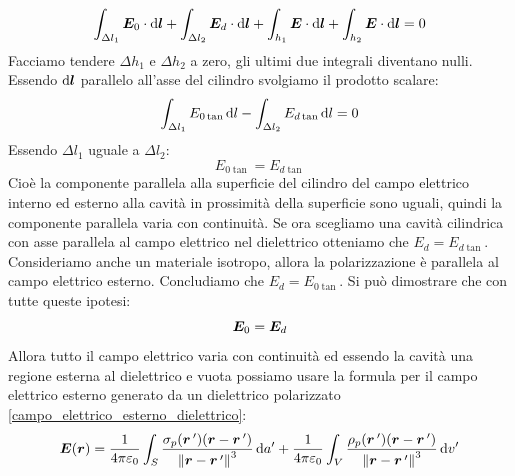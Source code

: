 \begin{equation}
  \int_{\Delta l_1}\boldsymbol{E}_0\cdot\mathrm{d}\boldsymbol{l}+\int_{\Delta l_2}\boldsymbol{E}_d\cdot\mathrm{d}\boldsymbol{l}+\int_{h_1}\boldsymbol{E}\cdot\mathrm{d}\boldsymbol{l}+\int_{h_2}\boldsymbol{E}\cdot\mathrm{d}\boldsymbol{l}=0
\end{equation}
Facciamo tendere $\Delta h_1$ e $\Delta h_2$ a zero, gli ultimi due integrali diventano nulli. Essendo $\mathrm{d} \boldsymbol{l}$ parallelo all'asse del cilindro svolgiamo il prodotto scalare:
\begin{equation}
  \int_{\Delta l_1}E_{0\tan}\,\mathrm{d} l-\int_{\Delta l_2}E_{d\tan}\,\mathrm{d} l=0
\end{equation}
Essendo $\Delta l_1$ uguale a $\Delta l_2$:
\begin{equation}
  E_{0\tan}=E_{d\tan}
  \label{E_tangente10}
\end{equation}
Cioè la componente parallela alla superficie del cilindro del campo elettrico interno ed esterno alla cavità in prossimità della superficie sono uguali, quindi la componente parallela varia con continuità. Se ora scegliamo una cavità cilindrica con asse parallela al campo elettrico nel dielettrico otteniamo che $E_d=E_{d\tan}$. Consideriamo anche un materiale isotropo, allora la polarizzazione è parallela al campo elettrico esterno. Concludiamo che $E_d=E_{0\tan}$. Si può dimostrare che con tutte queste ipotesi:
\begin{equation}
  \boldsymbol{E}_0=\boldsymbol{E}_d
\end{equation}
Allora tutto il campo elettrico varia con continuità ed essendo la cavità una regione esterna al dielettrico e vuota possiamo usare la formula per il campo elettrico esterno generato da un dielettrico polarizzato \eqref{campo_elettrico_esterno_dielettrico}:
\begin{equation}
  \boldsymbol{E}(\boldsymbol{r})=\frac{1}{4\pi\varepsilon_0}\int_S\frac{\sigma_p(\boldsymbol{r}\,')(\boldsymbol{r}-\boldsymbol{r}\,')}{\left\lVert\boldsymbol{r}-\boldsymbol{r}\,'\right\rVert^3}\,\mathrm{d} a'+\frac{1}{4\pi\varepsilon_0}\int_V\frac{\rho_p(\boldsymbol{r}\,')(\boldsymbol{r}-\boldsymbol{r}\,')}{\left\lVert\boldsymbol{r}-\boldsymbol{r}\,'\right\rVert^3}\,\mathrm{d} v'
\end{equation}

